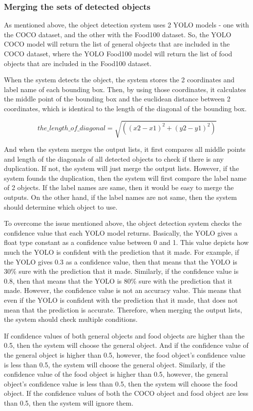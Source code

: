 \documentclass{article}
\begin{document}
\subsubsection{Merging the sets of detected objects}

As mentioned above, the object detection system uses 2 YOLO models - one with the COCO dataset, and the other with the Food100 dataset. So, the YOLO COCO model will return the list of general objects that are included in the COCO dataset, where the YOLO Food100 model will return the list of food objects that are included in the Food100 dataset.

When the system detects the object, the system stores the 2 coordinates and label name of each bounding box. Then, by using those coordinates, it calculates the middle point of the bounding box and the euclidean distance between 2 coordinates, which is identical to the length of the diagonal of the bounding box. 

\[the\_length\_of\_diagonal = \sqrt{((x2 - x1)^{2} + (y2 - y1)^{2})}\]

And when the system merges the output lists, it first compares all middle points and length of the diagonals of all detected objects to check if there is any duplication. If not, the system will just merge the output lists. However, if the system founds the duplication, then the system will first compare the label name of 2 objects. If the label names are same, then it would be easy to merge the outputs. On the other hand, if the label names are not same, then the system should determine which object to use.

To overcome the issue mentioned above, the object detection system checks the confidence value that each YOLO model returns. Basically, the YOLO gives a float type constant as a confidence value between 0 and 1. This value depicts how much the YOLO is confident with the prediction that it made. For example, if the YOLO gives 0.3 as a confidence value, then that means that the YOLO is 30\% sure with the prediction that it made. Similarly, if the confidence value is 0.8, then that means that the YOLO is 80\% sure with the prediction that it made. However, the confidence value is not an accuracy value. This means that even if the YOLO is confident with the prediction that it made, that does not mean that the prediction is accurate. Therefore, when merging the output lists, the system should check multiple conditions.

If confidence values of both general objects and food objects are higher than the 0.5, then the system will choose the general object. And if the confidence value of the general object is higher than 0.5, however, the food object's confidence value is less than 0.5, the system will choose the general object. Similarly, if the confidence value of the food object is higher than 0.5, however, the general object's confidence value is less than 0.5, then the system will choose the food object. If the confidence values of both the COCO object and food object are less than 0.5, then the system will ignore them.
\end{document}
